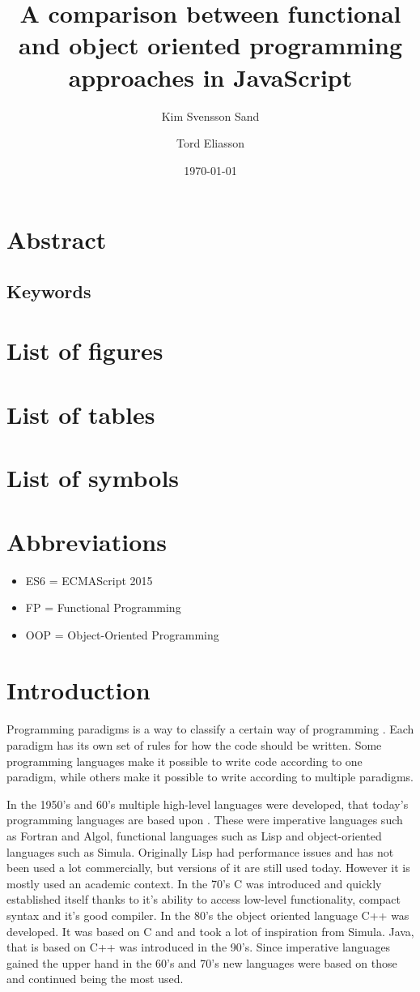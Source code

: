 \documentclass {article}
\title{A comparison between functional and object oriented programming approaches in JavaScript}
\date{\today}
\author{
Kim Svensson Sand \and Tord Eliasson
}
\begin{document}
\maketitle
{}
\newpage
\tableofcontents
\newpage
{}
\section{Abstract}
\subsection{Keywords}
\section{List of figures}
\section{List of tables}
\section{List of symbols}
\section{Abbreviations}
\begin{itemize}[leftmargin=*]
\item [ ] ES6 = ECMAScript 2015
\item [ ] FP = Functional Programming
\item [ ] OOP = Object-Oriented Programming
\end{itemize}
\section{Introduction}
Programming paradigms is a way to classify a certain way of programming \cite{programming-paradigms}. Each paradigm has its own set of rules for how the code should be written. Some programming languages make it possible to write code according to one paradigm,  while others make it possible to write according to multiple paradigms. 

In the 1950's and 60's multiple high-level languages were developed, that today's programming languages are based upon \cite{gabmar}. These were imperative languages such as Fortran and Algol, functional languages such as Lisp and object-oriented languages such as Simula. Originally Lisp had performance issues and has not been used a lot commercially, but versions of it are still used today. However it is mostly used an academic context. In the 70's C was introduced and quickly established itself thanks to it's ability to access low-level functionality, compact syntax and it's good compiler. In the 80's the object oriented language C++ was developed. It was based on C and and took a lot of inspiration from Simula. Java, that is based on C++ was introduced in the 90's. Since imperative languages gained the upper hand in the 60's and 70's new languages were based on those and continued being the most used. 
\end{document}
